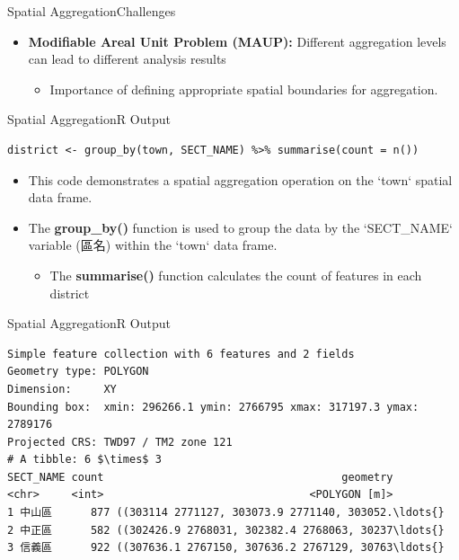 \documentclass[hyperref={pdfpagelabels=false}]{beamer}
\begin{document}
\begin{frame}{Spatial Aggregation}{Challenges}	
	\begin{itemize}
		\item \textbf{Modifiable Areal Unit Problem (MAUP):} Different aggregation levels can lead to different analysis results
									\vspace{0.2cm}
			\begin{itemize}
		\item Importance of defining appropriate spatial boundaries for aggregation.
			\end{itemize}
	\end{itemize}
\end{frame}










\begin{frame}[fragile]{Spatial Aggregation}{R Output}
\begin{lstlisting}
district <- group_by(town, SECT_NAME) %>% summarise(count = n())
\end{lstlisting}
\begin{itemize}
	\item This code demonstrates a spatial aggregation operation on the `town` spatial data frame.
	\vspace{0.2cm}
	\item The \textbf{group\_by()} function is used to group the data by the `SECT\_NAME` variable (區名) within the `town` data frame.
	
	\begin{itemize}
		\vspace{0.2cm}
		\item The \textbf{summarise()} function calculates the count of features in each district 
	\end{itemize}
	
\end{itemize}
\end{frame}




\begin{frame}[fragile]{Spatial Aggregation}{R Output}
	
	\tiny
	
\begin{lstlisting}
Simple feature collection with 6 features and 2 fields
Geometry type: POLYGON
Dimension:     XY
Bounding box:  xmin: 296266.1 ymin: 2766795 xmax: 317197.3 ymax: 2789176
Projected CRS: TWD97 / TM2 zone 121
# A tibble: 6 $\times$ 3
SECT_NAME count                                     geometry
<chr>     <int>                                <POLYGON [m]>
1 中山區      877 ((303114 2771127, 303073.9 2771140, 303052.\ldots{}
2 中正區      582 ((302426.9 2768031, 302382.4 2768063, 30237\ldots{}
3 信義區      922 ((307636.1 2767150, 307636.2 2767129, 30763\ldots{}
\end{lstlisting}
	
\end{frame}
\end{document}
